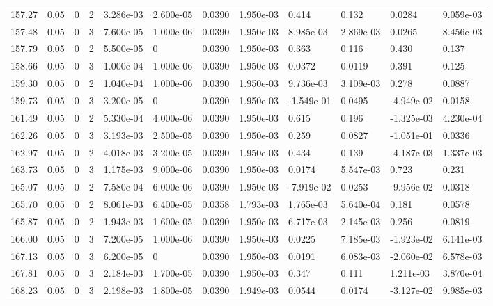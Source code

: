 \documentclass[preview]{standalone}
\begin{document}
{{{{{{\begin{tabular}{L{1.2cm}C{1.2cm} C{0.3cm}C{0.5cm} C{1.4cm}C{1.4cm} C{1.4cm}C{1.4cm} C{1.6cm}C{1.6cm} C{1.6cm}C{1.6cm}}
  157.27  &  0.05  & 0     &  2 &  3.286e-03  & 2.600e-05  &  0.0390&   1.950e-03& 0.414 & 0.132   &  0.0284 & 9.059e-03  \\ 
  157.48  &  0.05  & 0     &  3 &  7.600e-05  & 1.000e-06  &  0.0390&   1.950e-03& 8.985e-03 & 2.869e-03   &  0.0265 & 8.456e-03  \\ 
  157.79  &  0.05  & 0     &  2 &  5.500e-05  & 0  &  0.0390&   1.950e-03& 0.363 & 0.116   &  0.430 & 0.137  \\ 
  158.66  &  0.05  & 0     &  3 &  1.000e-04  & 1.000e-06  &  0.0390&   1.950e-03& 0.0372 & 0.0119   &  0.391 & 0.125  \\ 
  159.30  &  0.05  & 0     &  2 &  1.040e-04  & 1.000e-06  &  0.0390&   1.950e-03& 9.736e-03 & 3.109e-03   &  0.278 & 0.0887  \\ 
  159.73  &  0.05  & 0     &  3 &  3.200e-05  & 0  &  0.0390&   1.950e-03& -1.549e-01 & 0.0495   &  -4.949e-02 & 0.0158  \\ 
  161.49  &  0.05  & 0     &  2 &  5.330e-04  & 4.000e-06  &  0.0390&   1.950e-03& 0.615 & 0.196   &  -1.325e-03 & 4.230e-04  \\ 
  162.26  &  0.05  & 0     &  3 &  3.193e-03  & 2.500e-05  &  0.0390&   1.950e-03& 0.259 & 0.0827   &  -1.051e-01 & 0.0336  \\ 
  162.97  &  0.05  & 0     &  2 &  4.018e-03  & 3.200e-05  &  0.0390&   1.950e-03& 0.434 & 0.139   &  -4.187e-03 & 1.337e-03  \\ 
  163.73  &  0.05  & 0     &  3 &  1.175e-03  & 9.000e-06  &  0.0390&   1.950e-03& 0.0174 & 5.547e-03   &  0.723 & 0.231  \\ 
  165.07  &  0.05  & 0     &  2 &  7.580e-04  & 6.000e-06  &  0.0390&   1.950e-03& -7.919e-02 & 0.0253   &  -9.956e-02 & 0.0318  \\ 
  165.70  &  0.05  & 0     &  2 &  8.061e-03  & 6.400e-05  &  0.0358&   1.793e-03& 1.765e-03 & 5.640e-04   &  0.181 & 0.0578  \\ 
  165.87  &  0.05  & 0     &  2 &  1.943e-03  & 1.600e-05  &  0.0390&   1.950e-03& 6.717e-03 & 2.145e-03   &  0.256 & 0.0819  \\ 
  166.00  &  0.05  & 0     &  3 &  7.200e-05  & 1.000e-06  &  0.0390&   1.950e-03& 0.0225 & 7.185e-03   &  -1.923e-02 & 6.141e-03  \\ 
  167.13  &  0.05  & 0     &  3 &  6.200e-05  & 0  &  0.0390&   1.950e-03& 0.0191 & 6.083e-03   &  -2.060e-02 & 6.578e-03  \\ 
  167.81  &  0.05  & 0     &  3 &  2.184e-03  & 1.700e-05  &  0.0390&   1.950e-03& 0.347 & 0.111   &  1.211e-03 & 3.870e-04  \\ 
  168.23  &  0.05  & 0     &  3 &  2.198e-03  & 1.800e-05  &  0.0390&   1.949e-03& 0.0544 & 0.0174   &  -3.127e-02 & 9.985e-03  \\ 
\hline 
\end{tabular} 

}}}}}}
\end{document}
